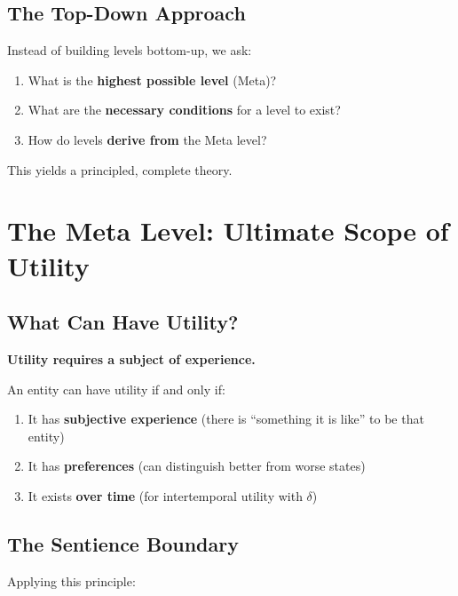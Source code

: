 \subsection{The Top-Down Approach}

Instead of building levels bottom-up, we ask:
\begin{enumerate}
\item What is the \textbf{highest possible level} (Meta)?
\item What are the \textbf{necessary conditions} for a level to exist?
\item How do levels \textbf{derive from} the Meta level?
\end{enumerate}

This yields a principled, complete theory.

\section{The Meta Level: Ultimate Scope of Utility}
\label{sec:aaa-meta}

\subsection{What Can Have Utility?}

\begin{tcolorbox}[colback=blue!5!white, colframe=blue!75!black, title=Fundamental Principle]
\textbf{Utility requires a subject of experience.}

An entity can have utility if and only if:
\begin{enumerate}
\item It has \textbf{subjective experience} (there is ``something it is like'' to be that entity)
\item It has \textbf{preferences} (can distinguish better from worse states)
\item It exists \textbf{over time} (for intertemporal utility with $\delta$)
\end{enumerate}
\end{tcolorbox}

\subsection{The Sentience Boundary}

Applying this principle:


